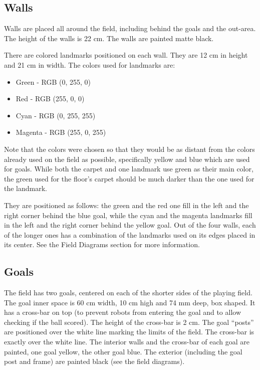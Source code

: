 \documentclass{article}
\begin{document}
\subsection{ Walls \label{ref-031}}

Walls are placed all around the field, including behind the goals and the out-area. The height of the walls is 22 cm. The walls are painted matte black.

There are colored landmarks positioned on each wall. They are 12 cm in height and 21 cm in width. The colors used for landmarks are:

\begin{itemize}
\item Green - RGB (0, 255, 0)

\item Red - RGB (255, 0, 0)

\item Cyan - RGB (0, 255, 255)

\item Magenta - RGB (255, 0, 255)

\end{itemize}
Note that the colors were chosen so that they would be as distant from the colors already used on the field as possible, specifically yellow and blue which are used for goals. While both the carpet and one landmark use green as their main color, the green used for the floor's carpet should be much darker than the one used for the landmark.

They are positioned as follows: the green and the red one fill in the left and the right corner behind the blue goal, while the cyan and the magenta landmarks fill in the left and the right corner behind the yellow goal. Out of the four walls, each of the longer ones has a combination of the landmarks used on its edges placed in its center. See the Field Diagrams section for more information.

\subsection{ Goals \label{ref-032}}

The field has two goals, centered on each of the shorter sides of the playing field. The goal inner space is 60 cm width, 10 cm high and 74 mm deep, box shaped. It has a cross-bar on top (to prevent robots from entering the goal and to allow checking if the ball scored). The height of the cross-bar is 2 cm. The goal ``posts'' are positioned over the white line marking the limits of the field. The cross-bar is exactly over the white line. The interior walls and the cross-bar of each goal are painted, one goal yellow, the other goal blue. The exterior (including the goal post and frame) are painted black (see the field diagrams).
\end{document}
